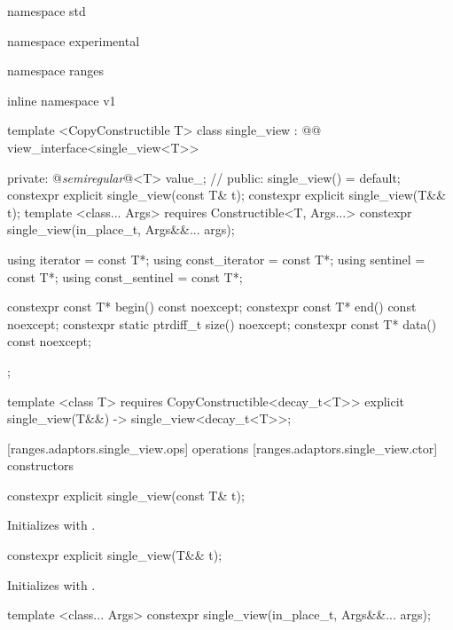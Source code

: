 \begin{codeblock}
namespace std { namespace experimental { namespace ranges { inline namespace v1 {
  template <CopyConstructible T>
  class single_view : @@ view_interface<single_view<T>> {
  private:
    @\textit{semiregular}@<T> value_; // \expos
  public:
    single_view() = default;
    constexpr explicit single_view(const T& t);
    constexpr explicit single_view(T&& t);
    template <class... Args>
      requires Constructible<T, Args...>
    constexpr single_view(in_place_t, Args&&... args);

    using iterator = const T*;
    using const_iterator = const T*;
    using sentinel = const T*;
    using const_sentinel = const T*;

    constexpr const T* begin() const noexcept;
    constexpr const T* end() const noexcept;
    constexpr static ptrdiff_t size() noexcept;
    constexpr const T* data() const noexcept;
  };

  template <class T>
  requires CopyConstructible<decay_t<T>>
  explicit single_view(T&&) -> single_view<decay_t<T>>;
}}}}
\end{codeblock}

[ranges.adaptors.single_view.ops]{ operations}
[ranges.adaptors.single_view.ctor]{ constructors}

%
\begin{itemdecl}
constexpr explicit single_view(const T& t);
\end{itemdecl}

\begin{itemdescr}
\pnum
\effects Initializes  with .
\end{itemdescr}

%
\begin{itemdecl}
constexpr explicit single_view(T&& t);
\end{itemdecl}

\begin{itemdescr}
\pnum
\effects Initializes  with .
\end{itemdescr}

%
\begin{itemdecl}
template <class... Args>
constexpr single_view(in_place_t, Args&&... args);
\end{itemdecl}

